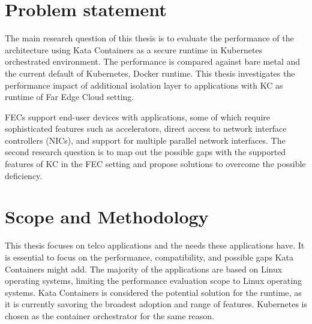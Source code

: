 \section{Problem statement}
\label{section:intro_problemstatement}

The main research question of this thesis is to evaluate the performance of the architecture using Kata Containers as a secure runtime in Kubernetes orchestrated environment. The performance is compared against bare metal and the current default of Kubernetes, Docker runtime. This thesis investigates the performance impact of additional isolation layer to applications with KC as runtime of Far Edge Cloud setting.

FECs support end-user devices with applications, some of which require sophisticated features such as accelerators, direct access to network interface controllers (NICs), and support for multiple parallel network interfaces. The second research question is to map out the possible gaps with the supported features of KC in the FEC setting and propose solutions to overcome the possible deficiency.





\section{Scope and Methodology}
\label{section:intro_scopemethodology}

This thesis focuses on telco applications and the needs these applications have. It is essential to focus on the performance, compatibility, and possible gaps Kata Containers might add. The majority of the applications are based on Linux operating systems, limiting the performance evaluation scope to Linux operating systems. Kata Containers is considered the potential solution for the runtime, as it is currently savoring the broadest adoption and range of features. Kubernetes is chosen as the container orchestrator for the same reason.

